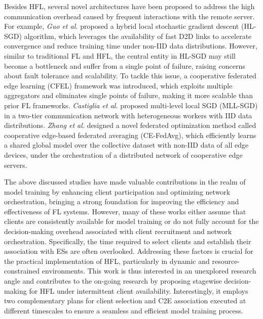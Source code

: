 Besides HFL, several novel architectures have been proposed to address the high communication overhead caused by frequent interactions with the remote server. For example, \textit{Guo et al.} \cite{ref53} proposed a hybrid local stochastic gradient descent (HL-SGD) algorithm, which leverages the availability of fast D2D links to accelerate convergence and reduce training time under non-IID data distributions. However, similar to traditional FL and HFL, the central entity in HL-SGD may still become a bottleneck and suffer from a single point of failure, raising concerns about fault tolerance and scalability. To tackle this issue, a cooperative federated edge learning (CFEL) \cite{ref54,ref55} framework was introduced, which exploits multiple aggregators and eliminates single points of failure, making it more scalable than prior FL frameworks. \textit{Castiglia et al.} \cite{ref54} proposed multi-level local SGD (MLL-SGD) in a two-tier communication network with heterogeneous workers with IID data distributions. \textit{Zhang et al.} \cite{ref55} designed a novel federated optimization method called cooperative edge-based federated averaging (CE-FedAvg), which efficiently learns a shared global model over the collective dataset with non-IID data of all edge devices, under the orchestration of a distributed network of cooperative edge servers.

The above discussed studies have made valuable contributions in the realm of model training by enhancing client participation and optimizing network orchestration, bringing a strong foundation for improving the efficiency and effectiveness of FL systems. However, many of these works either assume that clients are consistently available for model training or do not fully account for the decision-making overhead associated with client recruitment and network orchestration. Specifically, the time required to select clients and establish their association with ESs are often overlooked. Addressing these factors is crucial for the practical implementation of HFL, particularly in dynamic and resource-constrained environments. This work is thus interested in an unexplored research angle and contributes to the on-going research by proposing stagewise decision-making for HFL under intermittent client availability. Interestingly, it employs two complementary plans for client selection and C2E association executed at different timescales to ensure a seamless and efficient model training process.
